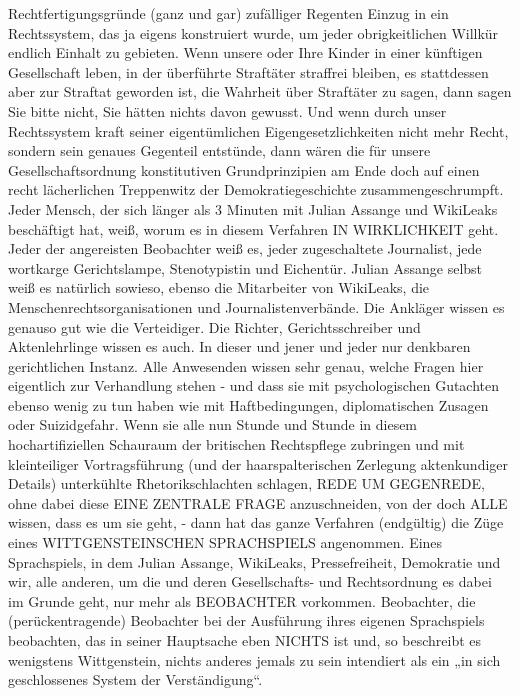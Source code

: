 \begin{multicols}{2}
{Rechtfertigungsgründe (ganz und gar) zufälliger Regenten Einzug in ein Rechtssystem, das ja eigens konstruiert
wurde, um jeder obrigkeitlichen Willkür endlich Einhalt
zu gebieten.\textCR
Wenn unsere oder Ihre Kinder in einer künftigen Gesellschaft leben, in der überführte Straftäter straffrei bleiben, es stattdessen aber zur Straftat geworden ist, die
Wahrheit über Straftäter zu sagen, dann sagen Sie bitte
nicht, Sie hätten nichts davon gewusst.\textCR
Und wenn durch unser Rechtssystem kraft seiner eigentümlichen Eigengesetzlichkeiten nicht mehr Recht, sondern sein genaues Gegenteil entstünde, dann wären die
für unsere Gesellschaftsordnung konstitutiven Grundprinzipien am Ende doch auf einen recht lächerlichen
Treppenwitz der Demokratiegeschichte zusammengeschrumpft.\textCR
Jeder Mensch, der sich länger als 3 Minuten mit Julian
Assange und WikiLeaks beschäftigt hat, weiß, worum es
in diesem Verfahren IN WIRKLICHKEIT geht. Jeder der
angereisten Beobachter weiß es, jeder zugeschaltete
Journalist, jede wortkarge Gerichtslampe, Stenotypistin
und Eichentür. Julian Assange selbst weiß es natürlich
sowieso, ebenso die Mitarbeiter von WikiLeaks, die Menschenrechtsorganisationen und Journalistenverbände.
Die Ankläger wissen es genauso gut wie die Verteidiger.
Die Richter, Gerichtsschreiber und Aktenlehrlinge wissen es auch. In dieser und jener und jeder nur denkbaren gerichtlichen Instanz. Alle Anwesenden wissen sehr
genau, welche Fragen hier eigentlich zur Verhandlung
stehen - und dass sie mit psychologischen Gutachten
ebenso wenig zu tun haben wie mit Haftbedingungen,
diplomatischen Zusagen oder Suizidgefahr.\textCR
Wenn sie alle nun Stunde und Stunde in diesem hochartifiziellen Schauraum der britischen Rechtspflege zubringen und mit kleinteiliger Vortragsführung (und der
haarspalterischen Zerlegung aktenkundiger Details)
unterkühlte Rhetorikschlachten schlagen, REDE UM
GEGENREDE, ohne dabei diese EINE ZENTRALE FRAGE anzuschneiden, von der doch ALLE wissen, dass es
um sie geht, - dann hat das ganze Verfahren (endgültig)
die Züge eines WITTGENSTEINSCHEN SPRACHSPIELS
angenommen.\textCR
Eines Sprachspiels, in dem Julian Assange, WikiLeaks,
Pressefreiheit, Demokratie und wir, alle anderen, um die
und deren Gesellschafts- und Rechtsordnung es dabei
im Grunde geht, nur mehr als BEOBACHTER vorkommen. Beobachter, die (perückentragende) Beobachter
bei der Ausführung ihres eigenen Sprachspiels beobachten, das in seiner Hauptsache eben NICHTS ist und, so
beschreibt es wenigstens Wittgenstein, nichts anderes
jemals zu sein intendiert als ein „in sich geschlossenes
System der Verständigung“.}



\end{multicols}
